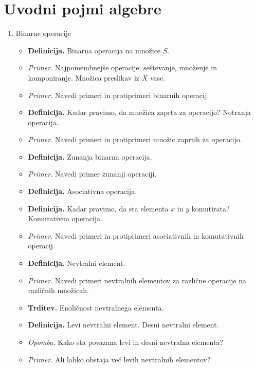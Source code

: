 \newpage
\section{Uvodni pojmi algebre}

\begin{enumerate}
    \item Binarne operacije
    \begin{itemize}
        \item \colorbox{purple!30}{\textbf{Definicija.}} Binarna operacija na množice $S$.        
        \item \colorbox{yellow!30}{\emph{Primer.}} Najpomembnejše operacije: seštevanje, množenje in komponiranje. Množica preslikav iz $X$ vase.
        \item \colorbox{yellow!30}{\emph{Primer.}} Navedi primeri in protiprimeri binarnih operacij.
        \item \colorbox{purple!30}{\textbf{Definicija.}} Kadar pravimo, da množica zaprta za operacijo? Notranja operacija.
        \item \colorbox{yellow!30}{\emph{Primer.}} Navedi primeri in protiprimeri množic zaprtih za operacijo. 
        \item \colorbox{purple!30}{\textbf{Definicija.}} Zunanja binarna operacija. 
        \item \colorbox{yellow!30}{\emph{Primer.}} Navedi primer zunanji operaciji.
        \item \colorbox{purple!30}{\textbf{Definicija.}} Asociativna operacija. 
        \item \colorbox{purple!30}{\textbf{Definicija.}} Kadar pravimo, da sta elementa $x$ in $y$ komutirata? Komutativna operacija.
        \item \colorbox{yellow!30}{\emph{Primer.}} Navedi primeri in protiprimeri asociativnih in komutativnih operacij.
        \item \colorbox{purple!30}{\textbf{Definicija.}} Nevtralni element.
        \item \colorbox{yellow!30}{\emph{Primer.}} Navedi primeri nevtralnih elementov za različne operacije na različnih množicah.
        \item \colorbox{blue!30}{\textbf{Trditev.}} Enoličnost nevtralnega elementa.
        \item \colorbox{purple!30}{\textbf{Definicija.}} Levi nevtralni element. Desni nevtralni element.
        \item \colorbox{yellow!30}{\emph{Opomba.}} Kako sta povazana levi in desni nevtralna elementa?
        \item \colorbox{yellow!30}{\emph{Primer.}} Ali lahko obstaja več levih nevtralnih elementov?
    \end{itemize}


\end{enumerate}
